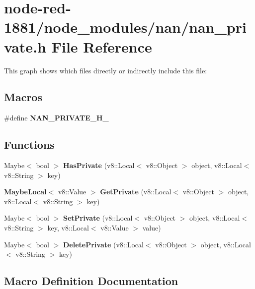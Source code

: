 \section{node-\/red-\/1881/node\+\_\+modules/nan/nan\+\_\+private.h File Reference}
\label{nan__private_8h}
This graph shows which files directly or indirectly include this file\+:
\subsection*{Macros}
\begin{DoxyCompactItemize}
\item 
\#define \textbf{ N\+A\+N\+\_\+\+P\+R\+I\+V\+A\+T\+E\+\_\+\+H\+\_\+}
\end{DoxyCompactItemize}
\subsection*{Functions}
\begin{DoxyCompactItemize}
\item 
Maybe$<$ bool $>$ \textbf{ Has\+Private} (v8\+::\+Local$<$ v8\+::\+Object $>$ object, v8\+::\+Local$<$ v8\+::\+String $>$ key)
\item 
\textbf{ Maybe\+Local}$<$ v8\+::\+Value $>$ \textbf{ Get\+Private} (v8\+::\+Local$<$ v8\+::\+Object $>$ object, v8\+::\+Local$<$ v8\+::\+String $>$ key)
\item 
Maybe$<$ bool $>$ \textbf{ Set\+Private} (v8\+::\+Local$<$ v8\+::\+Object $>$ object, v8\+::\+Local$<$ v8\+::\+String $>$ key, v8\+::\+Local$<$ v8\+::\+Value $>$ value)
\item 
Maybe$<$ bool $>$ \textbf{ Delete\+Private} (v8\+::\+Local$<$ v8\+::\+Object $>$ object, v8\+::\+Local$<$ v8\+::\+String $>$ key)
\end{DoxyCompactItemize}


\subsection{Macro Definition Documentation}
\mbox{\label{nan_8h_a19c4a46a992546ef3be04a18b25369a7}} 
